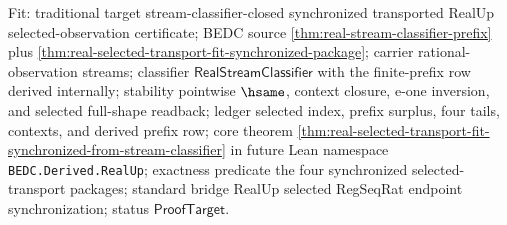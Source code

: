 Fit: traditional target stream-classifier-closed synchronized transported
RealUp selected-observation certificate; BEDC source
\autoref{thm:real-stream-classifier-prefix} plus
\autoref{thm:real-selected-transport-fit-synchronized-package}; carrier
rational-observation streams; classifier $\mathsf{RealStreamClassifier}$ with
the finite-prefix row derived internally; stability pointwise $\hsame$,
context closure, e-one inversion, and selected full-shape readback; ledger
selected index, prefix surplus, four tails, contexts, and derived prefix row;
core theorem
\autoref{thm:real-selected-transport-fit-synchronized-from-stream-classifier}
in future Lean namespace \texttt{BEDC.Derived.RealUp}; exactness predicate the
four synchronized selected-transport packages; standard bridge RealUp selected
RegSeqRat endpoint synchronization; status $\mathsf{ProofTarget}$.
